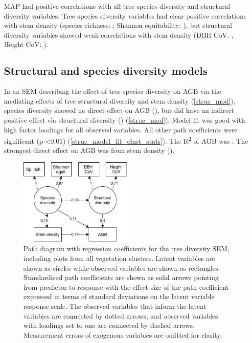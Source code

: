 \documentclass[11pt,a4paper]{article}
\begin{document}
MAP had positive correlations with all tree species diversity and structural diversity variables. Tree species diversity variables had clear positive correlations with stem density (species richness: \ccsi{}; Shannon equitability: \ccei{}), but structural diversity variables showed weak correlations with stem density (DBH CoV: \ccdvi{}, Height CoV: \cchvi{}).

\subsection{Structural and species diversity models}

In an SEM describing the effect of tree species diversity on AGB via the mediating effects of tree structural diversity and stem density (\autoref{struc_mod}), species diversity showed no direct effect on AGB (\strucbetadb{}), but did have an indirect positive effect via structural diversity (\strucbetadib{}) (\autoref{struc_mod}). Model fit was good with high factor loadings for all observed variables. All other path coefficients were significant (p <0.01) (\autoref{struc_model_fit_clust_stats}). The R\textsuperscript{2} of AGB was \strucrsq{}. The strongest direct effect on AGB was from stem density (\strucbetaib{}).

\begin{figure}[H]
\centering
	\includegraphics[width=0.5\textwidth]{struc}
	\caption{Path diagram with regression coefficients for the tree diversity SEM, including plots from all vegetation clusters. Latent variables are shown as circles while observed variables are shown as rectangles. Standardised path coefficients are shown as solid arrows pointing from predictor to response with the effect size of the path coefficient expressed in terms of standard deviations on the latent variable response scale. The observed variables that inform the latent variables are connected by dotted arrows, and observed variables with loadings set to one are connected by dashed arrows. Measurement errors of exogenous variables are omitted for clarity.}
	\label{struc_mod}
\end{figure}
\end{document}
